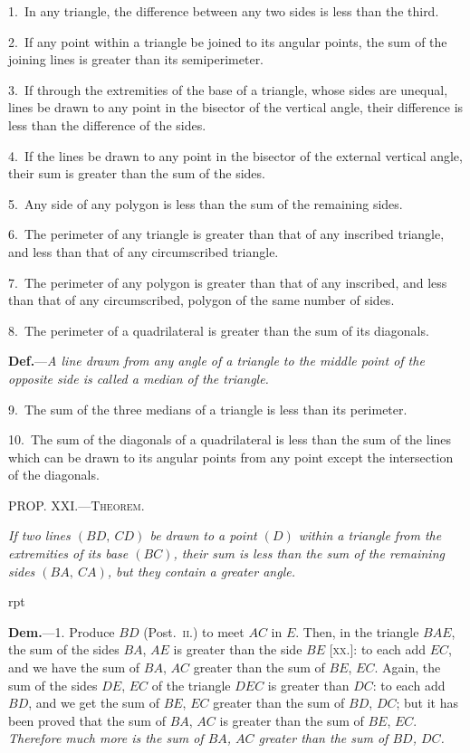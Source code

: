 \documentclass[oneside]{book}
\newcommand\mypropl[2]{
\bigskip\Needspace*{4\baselineskip}\begin{center}\textsc{#1}\end{center}
\hspace{\parindent}\emph{#2}\par\medskip
}
\newcommand\imgflow[3]{
\setcounter{wrapwidth}{#1}
\begin{wrapfigure}[#2]{r}{\value{wrapwidth}pt}
\begin{center}
\vspace{-0.3in}
\end{center}
\end{wrapfigure}
}
\begin{document}
\begin{footnotesize}
1.~In any triangle, the difference between any two sides is less
than the third.

2.~If any point within a triangle be joined to its angular points,
the sum of the joining lines is greater than its semiperimeter.

3.~If through the extremities of the base of a triangle, whose
sides are unequal, lines be drawn to any point in the bisector of
the vertical angle, their difference is less than the difference of
the sides.

4.~If the lines be drawn to any point in the bisector of the
external vertical angle, their sum is greater than the sum of the
sides.

5.~Any side of any polygon is less than the sum of the remaining
sides.

6.~The perimeter of any triangle is greater than that of any
inscribed triangle, and less than that of any circumscribed triangle.

7.~The perimeter of any polygon is greater than that of any
inscribed, and less than that of any circumscribed, polygon of the
same number of sides.

8.~The perimeter of a quadrilateral is greater than the sum of
its diagonals.

\textbf{Def.}---\emph{A line drawn from any angle of a triangle to the middle
point of the opposite side is called a median of the triangle.}

9.~The sum of the three medians of a triangle is less than its
perimeter.

10.~The sum of the diagonals of a quadrilateral is less than the
sum of the lines which can be drawn to its angular points from
any point except the intersection of the diagonals.
\par\end{footnotesize}


\mypropl{PROP\@. XXI\@.---Theorem.}{If two lines $(BD,\ CD)$ be drawn to a point $(D)$ within
a triangle from the extremities of its base $(BC)$, their sum
is less than the sum of the remaining sides $(BA,\ CA)$, but
they contain a greater angle.}

\imgflow{125}{8}{f037}

\textbf{Dem.}---1. Produce $BD$ (Post.~\textsc{ii}.) to meet $AC$ in $E$.
Then, in the triangle $BAE$, the
sum of the sides $BA$, $AE$ is
greater than the side $BE$ [\textsc{xx}.]:
to each add $EC$, and we have
the sum of $BA$, $AC$ greater
than the sum of $BE$, $EC$. Again,
the sum of the sides $DE$, $EC$ of
the triangle $DEC$ is greater
than $DC$: to each add $BD$, and
we get the sum of $BE$, $EC$ greater than the sum of $BD$,
$DC$; but it has been proved that the sum of $BA$, $AC$ is
greater than the sum of $BE$, $EC$. \emph{Therefore much
more is the sum of $BA$, $AC$ greater than the sum of
$BD$, $DC$.}
\end{document}
